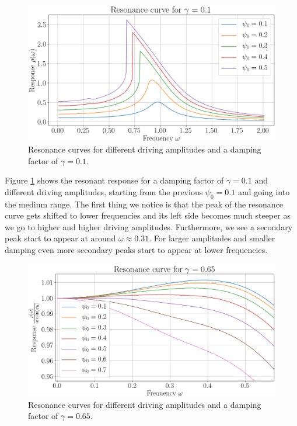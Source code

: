 \documentclass[10pt,a4paper,twocolumn]{article}
\begin{document}
\begin{figure}
\centering
\captionsetup{justification=centering}
\includegraphics[scale=0.25]{medium_amp.png}
\caption{Resonance curves for different driving amplitudes and a damping factor of $\gamma=0.1$.}
\label{fig:medium_amp}
\end{figure}

Figure \ref{fig:medium_amp} shows the resonant response for a damping factor of $\gamma=0.1$ and different driving amplitudes, starting from the previous $\psi_0=0.1$ and going into the medium range. The first thing we notice is that the peak of the resonance curve gets shifted to lower frequencies and its left side becomes much steeper as we go to higher and higher driving amplitudes. Furthermore, we see a secondary peak start to appear at around $\omega \approx 0.31$. For larger amplitudes and smaller damping even more secondary peaks start to appear at lower frequencies.

\begin{figure}[h]
\centering
\captionsetup{justification=centering}
\includegraphics[scale=0.25]{trans_gamma.png}
\caption{Resonance curves for different driving amplitudes and a damping factor of $\gamma=0.65$.}
\label{fig:trans_gamma}
\end{figure}
\end{document}
